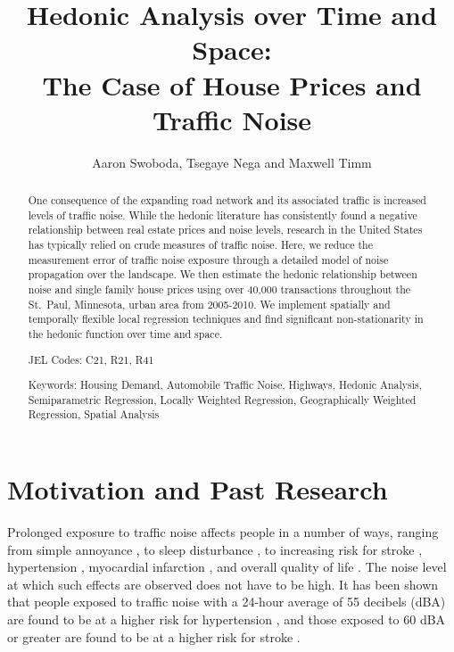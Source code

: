 \documentclass[leqno]{article}\usepackage[]{graphicx}\usepackage[]{color}
\title{Hedonic Analysis over Time and Space:\\ The Case of House Prices and Traffic Noise}
\date{}
\author{Aaron Swoboda, Tsegaye Nega and Maxwell Timm}
\begin{document}
\maketitle
{}
\begin{singlespace}
\begin{abstract}
One consequence of the expanding road network and its associated traffic is increased levels of traffic noise.  While the hedonic literature has consistently found a negative relationship between real estate prices and noise levels, research in the United States has typically relied on crude measures of traffic noise. Here, we reduce the measurement error of traffic noise exposure through a detailed model of noise propagation over the landscape. We then estimate the hedonic relationship between noise and single family house prices using over 40,000 transactions throughout the St.\ Paul, Minnesota, urban area from 2005-2010. We implement spatially and temporally flexible local regression techniques and find significant non-stationarity in the hedonic function over time and space.

\vspace{.3in}
\noindent
JEL Codes: C21, R21, R41

\vspace{.15in}
\noindent
Keywords: Housing Demand, Automobile Traffic Noise, Highways, Hedonic Analysis, Semiparametric Regression, Locally Weighted Regression, Geographically Weighted Regression, Spatial Analysis
\end{abstract}
\end{singlespace}

\clearpage
{} 

\section{Motivation and Past Research}\label{sec:lit}
Prolonged exposure to traffic noise affects people in a number of ways, ranging from simple annoyance \citep{Miedema2001, Ouis2001, Ohrstrom2007, DeKluizenaar2013, Weinhold2013}, to sleep disturbance , to increasing risk for stroke \citep{Sorensen2011}, hypertension \citep{Jarup2008, Bodin2009}, myocardial infarction \citep{Babisch2005}, and overall quality of life \citep{Shepherd2013}. The noise level at which such effects are observed does not have to be high.  It has been shown that people exposed to traffic noise with a 24-hour average of 55 decibels (dBA) are found to be at a higher risk for hypertension \citep{Barregard2009, Bodin2009}, and those exposed to 60 dBA or greater are found to be at a higher risk for stroke \citep{Sorensen2011}.  
\end{document}
